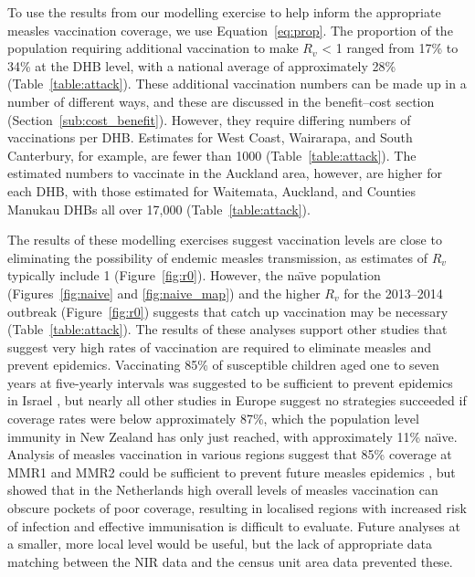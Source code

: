 \documentclass{article}
\begin{document}
\begin{itemize}
To use the results from our modelling exercise to help inform the appropriate measles vaccination coverage, we use Equation~\ref{eq:prop}. The proportion of the population requiring additional vaccination to make $R_v$ < 1 ranged from 17\% to 34\% at the DHB level, with a national average of approximately 28\% (Table~\ref{table:attack}). These additional vaccination numbers can be made up in a number of different ways, and these are discussed in the benefit--cost section (Section~\ref{sub:cost_benefit}). However, they require differing numbers of vaccinations per DHB. Estimates for West Coast, Wairarapa, and South Canterbury, for example, are fewer than 1000 (Table~\ref{table:attack}). The estimated numbers to vaccinate in the Auckland area, however, are higher for each DHB, with those estimated for Waitemata, Auckland, and Counties Manukau DHBs all over 17,000  (Table~\ref{table:attack}).

The results of these modelling exercises suggest vaccination levels are close to eliminating the possibility of endemic measles transmission, as estimates of $R_v$ typically include 1 (Figure~\ref{fig:r0}). However, the na\"{\i}ve population (Figures~\ref{fig:naive} and \ref{fig:naive_map}) and the higher $R_v$ for the 2013--2014 outbreak (Figure~\ref{fig:r0}) suggests that catch up vaccination may be necessary (Table~\ref{table:attack}). The results of these analyses support other studies that suggest very high rates of vaccination are required to eliminate measles and prevent epidemics. Vaccinating 85\% of susceptible children aged one to seven years at five-yearly intervals was suggested to be sufficient to prevent epidemics in Israel \citep{agur93}, but nearly all other studies in Europe suggest no strategies succeeded if coverage rates were below approximately 87\%, which the population level immunity in New Zealand has only just reached, with approximately 11\% na\"{\i}ve. Analysis of measles vaccination in various regions suggest that 85\% coverage at MMR1 and MMR2 could be sufficient to prevent future measles epidemics \citep{agur93, babad95, edmunds0, gay98, wallinga1}, but \citep{glass4} showed that in the Netherlands high overall levels of measles vaccination can obscure pockets of poor coverage, resulting in localised regions with increased risk of infection and effective immunisation is difficult to evaluate. Future analyses at a smaller, more local level would be useful, but the lack of appropriate data matching between the NIR data and the census unit area data prevented these.


\end{itemize}
\end{document}
